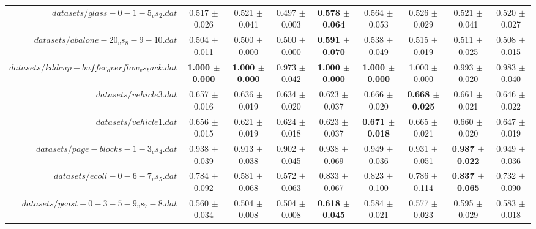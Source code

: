 \begin{table}[!ht]
{\begin{tabular}{r c c c c c c c c}
$datasets/glass-0-1-5_vs_2.dat$ & 0.517 $\pm$ 0.026 & 0.521 $\pm$ 0.041 & 0.497 $\pm$ 0.003 & \textbf{0.578 $\pm$ 0.064} & 0.564 $\pm$ 0.053 & 0.526 $\pm$ 0.029 & 0.521 $\pm$ 0.041 & 0.520 $\pm$ 0.027 \\
$datasets/abalone-20_vs_8-9-10.dat$ & 0.504 $\pm$ 0.011 & 0.500 $\pm$ 0.000 & 0.500 $\pm$ 0.000 & \textbf{0.591 $\pm$ 0.070} & 0.538 $\pm$ 0.049 & 0.515 $\pm$ 0.019 & 0.511 $\pm$ 0.025 & 0.508 $\pm$ 0.015 \\
$datasets/kddcup-buffer_overflow_vs_back.dat$ & \textbf{1.000 $\pm$ 0.000} & \textbf{1.000 $\pm$ 0.000} & 0.973 $\pm$ 0.042 & \textbf{1.000 $\pm$ 0.000} & \textbf{1.000 $\pm$ 0.000} & 1.000 $\pm$ 0.000 & 0.993 $\pm$ 0.020 & 0.983 $\pm$ 0.040 \\
$datasets/vehicle3.dat$ & 0.657 $\pm$ 0.016 & 0.636 $\pm$ 0.019 & 0.634 $\pm$ 0.020 & 0.623 $\pm$ 0.037 & 0.666 $\pm$ 0.020 & \textbf{0.668 $\pm$ 0.025} & 0.661 $\pm$ 0.021 & 0.646 $\pm$ 0.022 \\
$datasets/vehicle1.dat$ & 0.656 $\pm$ 0.015 & 0.621 $\pm$ 0.019 & 0.624 $\pm$ 0.018 & 0.623 $\pm$ 0.037 & \textbf{0.671 $\pm$ 0.018} & 0.665 $\pm$ 0.021 & 0.660 $\pm$ 0.020 & 0.647 $\pm$ 0.019 \\
$datasets/page-blocks-1-3_vs_4.dat$ & 0.938 $\pm$ 0.039 & 0.913 $\pm$ 0.038 & 0.902 $\pm$ 0.045 & 0.938 $\pm$ 0.069 & 0.949 $\pm$ 0.036 & 0.931 $\pm$ 0.051 & \textbf{0.987 $\pm$ 0.022} & 0.949 $\pm$ 0.036 \\
$datasets/ecoli-0-6-7_vs_5.dat$ & 0.784 $\pm$ 0.092 & 0.581 $\pm$ 0.068 & 0.572 $\pm$ 0.063 & 0.833 $\pm$ 0.067 & 0.823 $\pm$ 0.100 & 0.786 $\pm$ 0.114 & \textbf{0.837 $\pm$ 0.065} & 0.732 $\pm$ 0.090 \\
$datasets/yeast-0-3-5-9_vs_7-8.dat$ & 0.560 $\pm$ 0.034 & 0.504 $\pm$ 0.008 & 0.504 $\pm$ 0.008 & \textbf{0.618 $\pm$ 0.045} & 0.584 $\pm$ 0.021 & 0.577 $\pm$ 0.023 & 0.595 $\pm$ 0.029 & 0.583 $\pm$ 0.018 \\
\end{tabular}}
\end{table}
